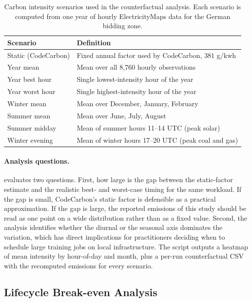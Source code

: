 \begin{table}[htbp]
\centering
\caption[Carbon intensity scenarios for counterfactual analysis.]{Carbon intensity scenarios used in the counterfactual analysis. Each scenario is computed from one year of hourly ElectricityMaps data for the German bidding zone.}
\label{tab:carbon_scenarios}
\begin{tabular}{ll}
\toprule
\textbf{Scenario} & \textbf{Definition} \\
\midrule
Static (CodeCarbon) & Fixed annual factor used by CodeCarbon, $381$ g/\gls{kwh} \\
Year mean           & Mean over all 8{,}760 hourly observations \\
Year best hour      & Single lowest-intensity hour of the year \\
Year worst hour     & Single highest-intensity hour of the year \\
Winter mean         & Mean over December, January, February \\
Summer mean         & Mean over June, July, August \\
Summer midday       & Mean of summer hours 11--14 UTC (peak solar) \\
Winter evening      & Mean of winter hours 17--20 UTC (peak coal and gas) \\
\bottomrule
\end{tabular}
\end{table}

\paragraph{Analysis questions.}
 evaluates two questions. First, how large is the gap between the static-factor estimate and the realistic best- and worst-case timing for the same workload. If the gap is small, CodeCarbon's static factor is defensible as a practical approximation. If the gap is large, the reported emissions of this study should be read as one point on a wide distribution rather than as a fixed value. Second, the analysis identifies whether the diurnal or the seasonal axis dominates the variation, which has direct implications for practitioners deciding when to schedule large training jobs on local infrastructure. The script outputs a heatmap of mean intensity by hour-of-day and month, plus a per-run counterfactual CSV with the recomputed emissions for every scenario.

\subsection{Lifecycle Break-even Analysis}
\label{design_lifecycle}

